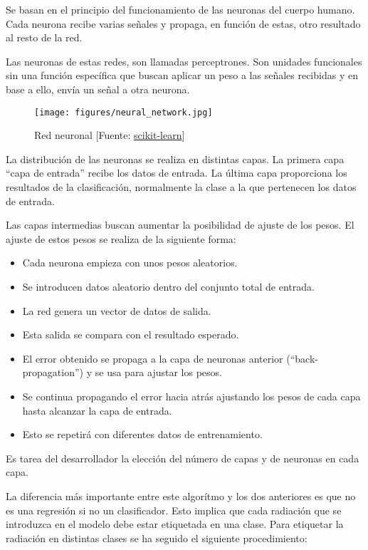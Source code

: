 	Se basan en el principio del funcionamiento de las neuronas del cuerpo humano. Cada neurona recibe varias señales y propaga, en función de estas, otro resultado al resto de la red.

	Las neuronas de estas redes, son llamadas perceptrones. Son unidades funcionales sin una función específica que buscan aplicar un peso a las señales recibidas y en base a ello, envía un señal a otra neurona.

	\begin{figure}[htb]
		\begin{center}
			\texttt{[image: figures/neural\_network.jpg]}
			\caption{Red neuronal [Fuente: \href{www.scikit-learn.org}{scikit-learn}] \label{network}}
		\end{center}
	\end{figure}

	La distribución de las neuronas se realiza en distintas capas. La primera capa ``capa de entrada'' recibe los datos de entrada. La última capa proporciona los resultados de la clasificación, normalmente la clase a la que pertenecen los datos de entrada.

	Las capas intermedias buscan aumentar la posibilidad de ajuste de los pesos. El ajuste de estos pesos se realiza de la siguiente forma:

	\begin{itemize}
		\item Cada neurona empieza con unos pesos aleatorios.
		\item Se introducen datos aleatorio dentro del conjunto total de entrada.
		\item La red genera un vector de datos de salida.
		\item Esta salida se compara con el resultado esperado.
		\item El error obtenido se propaga a la capa de neuronas anterior (``back-propagation'') y se usa para ajustar los pesos.
		\item Se continua propagando el error hacia atrás ajustando los pesos de cada capa hasta alcanzar la capa de entrada.
		\item Esto se repetirá con diferentes datos de entrenamiento.
 	\end{itemize}

	Es tarea del desarrollador la elección del número de capas y de neuronas en cada capa.

	La diferencia más importante entre este algorítmo y los dos anteriores es que no es una regresión si no un clasificador. Esto implica que cada radiación que se introduzca en el modelo debe estar etiquetada en una clase. Para etiquetar la radiación en distintas clases se ha seguido el siguiente procedimiento:


